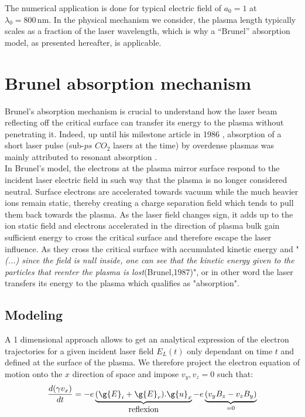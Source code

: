 \noindent The numerical application is done for typical electric field of $a_0 = 1$ at $\lambda_0 = 800\,\mathrm{nm}$. In the physical mechanism we consider, the plasma length typically scales as a fraction of the laser wavelength, which is why  a ``Brunel'' absorption model, as presented hereafter, is applicable.






\section{Brunel absorption mechanism}
\label{section:Brunel absorption mechanism}

Brunel's absorption mechanism is crucial to understand how the laser beam reflecting off the critical surface can transfer its energy to the plasma without penetrating it. Indeed, up until his milestone article in 1986 \cite{Brunel1987}, absorption of a short laser pulse (sub-$ ps$ $CO_2$ lasers at the time) by overdense plasmas was mainly attributed to resonant absorption \cite{freidberg1972resonant}. \\

\noindent In Brunel's model, the electrons at the plasma mirror surface respond to the incident laser electric field in such way that the plasma is no longer considered neutral. Surface electrons are accelerated towards vacuum while the much heavier ions remain static, thereby creating a charge separation field which tends to pull them back towards the plasma. As the laser field changes sign, it adds up to the ion static field and electrons accelerated in the direction of plasma bulk gain sufficient energy to cross the critical surface and therefore escape the laser influence. As they cross the critical surface with accumulated kinetic energy and "\textit{(...) since the field is null inside, one can see that the kinetic energy given to the particles that reenter the plasma is lost}(Brunel,1987\cite{Brunel1987})", or in other word the laser transfers its energy to the plasma which qualifies as "absorption".

\subsection{Modeling}

A 1 dimensional approach allows to get an analytical expression of the electron trajectories for a given incident laser field $E_L(t)$ only dependant on time $t$ and defined at the surface of the plasma. We therefore project the electron equation of motion onto the $x$ direction of space and impose $v_y,v_z = 0$ such that:
\begin{equation}
\frac{d(\gamma v_x)}{dt} = -e\underbrace{(\g{E}_i+\g{E}_r).\g{u}_x}_{\mbox{reflexion}} - e\underbrace{(v_y B_z - v_z B_y)}_{=0}
\end{equation}


